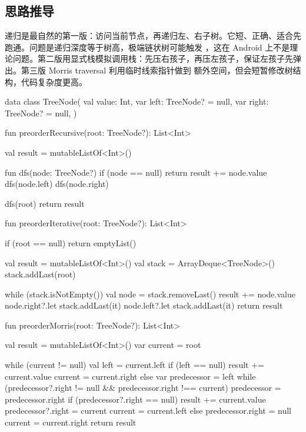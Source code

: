 \subsection*{思路推导}

递归是最自然的第一版：访问当前节点，再递归左、右子树。它短、正确、适合先跑通。问题是递归深度等于树高，极端链状树可能触发 ，这在 Android 上不是理论问题。第二版用显式栈模拟调用栈：先压右孩子，再压左孩子，保证左孩子先弹出。第三版 Morris traversal 利用临时线索指针做到  额外空间，但会短暂修改树结构，代码复杂度更高。

\begin{kotlin}
data class TreeNode(
    val value: Int,
    var left: TreeNode? = null,
    var right: TreeNode? = null,
)

fun preorderRecursive(root: TreeNode?): List<Int> {
    val result = mutableListOf<Int>()

    fun dfs(node: TreeNode?) {
        if (node == null) return
        result += node.value
        dfs(node.left)
        dfs(node.right)
    }

    dfs(root)
    return result
}

fun preorderIterative(root: TreeNode?): List<Int> {
    if (root == null) return emptyList()

    val result = mutableListOf<Int>()
    val stack = ArrayDeque<TreeNode>()
    stack.addLast(root)

    while (stack.isNotEmpty()) {
        val node = stack.removeLast()
        result += node.value
        node.right?.let { stack.addLast(it) }
        node.left?.let { stack.addLast(it) }
    }
    return result
}

fun preorderMorris(root: TreeNode?): List<Int> {
    val result = mutableListOf<Int>()
    var current = root

    while (current != null) {
        val left = current.left
        if (left == null) {
            result += current.value
            current = current.right
        } else {
            var predecessor = left
            while (predecessor?.right != null && predecessor.right !== current) {
                predecessor = predecessor.right
            }
            if (predecessor?.right == null) {
                result += current.value
                predecessor?.right = current
                current = current.left
            } else {
                predecessor.right = null
                current = current.right
            }
        }
    }
    return result
}
\end{kotlin}

